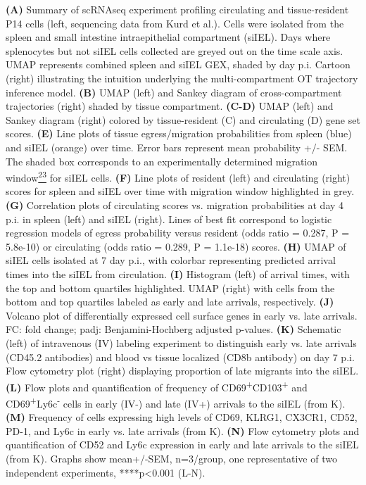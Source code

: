 \textbf{(A)} Summary of scRNAseq experiment profiling circulating and
tissue-resident P14 cells (left, sequencing data from Kurd et al.).
Cells were isolated from the spleen and small intestine intraepithelial
compartment (siIEL). Days where splenocytes but not siIEL cells
collected are greyed out on the time scale axis. UMAP represents
combined spleen and siIEL GEX, shaded by day p.i. Cartoon (right)
illustrating the intuition underlying the multi-compartment OT
trajectory inference model. \textbf{(B)} UMAP (left) and Sankey diagram
of cross-compartment trajectories (right) shaded by tissue compartment.
\textbf{(C-D)} UMAP (left) and Sankey diagram (right) colored by
tissue-resident (C) and circulating (D) gene set scores. \textbf{(E)}
Line plots of tissue egress/migration probabilities from spleen (blue)
and siIEL (orange) over time. Error bars represent mean probability +/-
SEM. The shaded box corresponds to an experimentally determined
migration
window\href{https://sciwheel.com/work/citation?ids=637212\&pre=\&suf=\&sa=0\&dbf=0}{\textsuperscript{23}}
for siIEL cells. \textbf{(F)} Line plots of resident (left) and
circulating (right) scores for spleen and siIEL over time with migration
window highlighted in grey. \textbf{(G)} Correlation plots of
circulating scores vs. migration probabilities at day 4 p.i. in spleen
(left) and siIEL (right). Lines of best fit correspond to logistic
regression models of egress probability versus resident (odds ratio =
0.287, P = 5.8e-10) or circulating (odds ratio = 0.289, P = 1.1e-18)
scores. \textbf{(H)} UMAP of siIEL cells isolated at 7 day p.i., with
colorbar representing predicted arrival times into the siIEL from
circulation. \textbf{(I)} Histogram (left) of arrival times, with the
top and bottom quartiles highlighted. UMAP (right) with cells from the
bottom and top quartiles labeled as early and late arrivals,
respectively. \textbf{(J)} Volcano plot of differentially expressed cell
surface genes in early vs. late arrivals. FC: fold change; padj:
Benjamini-Hochberg adjusted p-values. \textbf{(K)} Schematic (left) of
intravenous (IV) labeling experiment to distinguish early vs. late
arrivals (CD45.2 antibodies) and blood vs tissue localized (CD8b
antibody) on day 7 p.i. Flow cytometry plot (right) displaying
proportion of late migrants into the siIEL. \textbf{(L)} Flow plots and
quantification of frequency of
CD69\textsuperscript{+}CD103\textsuperscript{+} and
CD69\textsuperscript{+}Ly6c\textsuperscript{-} cells in early (IV-) and
late (IV+) arrivals to the siIEL (from K). \textbf{(M)} Frequency of
cells expressing high levels of CD69, KLRG1, CX3CR1, CD52, PD-1, and
Ly6c in early vs. late arrivals (from K). \textbf{(N)} Flow cytometry
plots and quantification of CD52 and Ly6c expression in early and late
arrivals to the siIEL (from K). Graphs show mean+/-SEM, n=3/group, one
representative of two independent experiments, ****p\textless{}0.001
(L-N).

